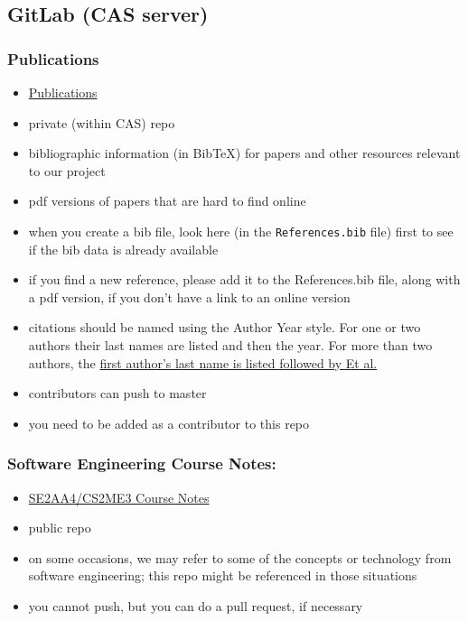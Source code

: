 \documentclass[12pt]{article}
\begin{document}
\subsection{GitLab (CAS server)}

\subsubsection{Publications}
\begin{itemize}
\item \href{https://gitlab.cas.mcmaster.ca/smiths/pub} {Publications}
\item private (within CAS) repo
\item bibliographic information (in BibTeX) for papers and other resources relevant to our project
\item pdf versions of papers that are hard to find online
\item when you create a bib file, look here (in the \texttt{References.bib}
file) first to see if the bib data is already available
\item if you find a new reference, please add it to the References.bib file,
along with a pdf version, if you don't have a link to an online version
\item citations should be named using the Author Year style.  For one or two
authors their last names are listed and then the year.  For more than two
authors, the
\href{https://www.mcgill.ca/library/files/library/cse-name-year-citation-style-guide.pdf}
{first author's last name is listed followed by Et al.}
\item contributors can push to master
\item you need to be added as a contributor to this repo
\end{itemize}

\subsubsection{Software Engineering Course Notes: }
\begin{itemize}
\item \href{https://gitlab.cas.mcmaster.ca/smiths/se2aa4_cs2me3} {SE2AA4/CS2ME3 Course Notes}
\item public repo
\item on some occasions, we may refer to some of the concepts or technology from
software engineering; this repo might be referenced in those situations
\item you cannot push, but you can do a pull request, if necessary
\end{itemize}
\end{document}
